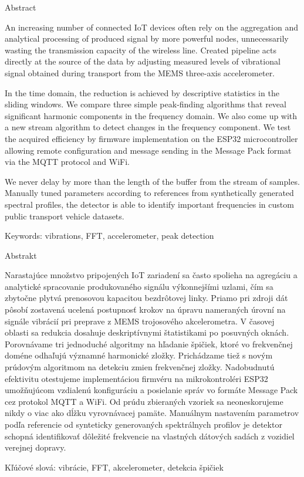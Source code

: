 Abstract

An increasing number of connected IoT devices often rely on the aggregation and analytical processing of produced
signal by more powerful nodes, unnecessarily wasting the transmission capacity of the wireless line.
Created pipeline acts directly at the source of the data by adjusting measured levels of vibrational signal
obtained during transport from the MEMS three-axis accelerometer.

In the time domain, the reduction is achieved by descriptive statistics in the sliding windows. We compare three 
simple peak-finding algorithms that reveal significant harmonic components in the frequency domain. We also come up 
with a new stream algorithm to detect changes in the frequency component. We test the acquired efficiency by
firmware implementation on the ESP32 microcontroller allowing remote configuration and message sending in the Message Pack format 
via the MQTT protocol and WiFi. 

We never delay by more than the length of the buffer from the stream of samples. Manually tuned
parameters according to references from synthetically generated spectral profiles, the detector is able to identify
important frequencies in custom public transport vehicle datasets.

Keywords: vibrations, FFT, accelerometer, peak detection


Abstrakt

Narastajúce množstvo pripojených IoT zariadení sa často spolieha na agregáciu a analytické spracovanie produkovaného
signálu výkonnejšími uzlami, čím sa zbytočne plytvá prenosovou kapacitou bezdrôtovej linky. Priamo pri zdroji dát pôsobí 
zostavená ucelená postupnosť krokov na úpravu nameraných úrovní na signále vibrácií pri preprave z MEMS trojosového akcelerometra.
V časovej oblasti sa redukcia dosahuje deskriptívnymi štatistikami po posuvných oknách. 
Porovnávame tri jednoduché algoritmy na hľadanie špičiek, ktoré vo frekvenčnej doméne odhaľujú významné harmonické zložky. 
Prichádzame tiež s novým prúdovým algoritmom na detekciu zmien frekvenčnej zložky. Nadobudnutú efektivitu otestujeme implementáciou 
firmvéru na mikrokontroléri ESP32 umožňujúcom vzdialenú konfiguráciu a posielanie správ vo formáte Message Pack cez protokol 
MQTT a WiFi. Od prúdu zbieraných vzoriek sa neoneskorujeme nikdy o viac ako dĺžku vyrovnávacej pamäte. Manuálnym nastavením 
parametrov podľa referencie od synteticky generovaných spektrálnych profilov je detektor schopná identifikovať dôležité 
frekvencie na vlastných dátových sadách z vozidiel verejnej dopravy.


Kľúčové slová: vibrácie, FFT, akcelerometer, detekcia špičiek